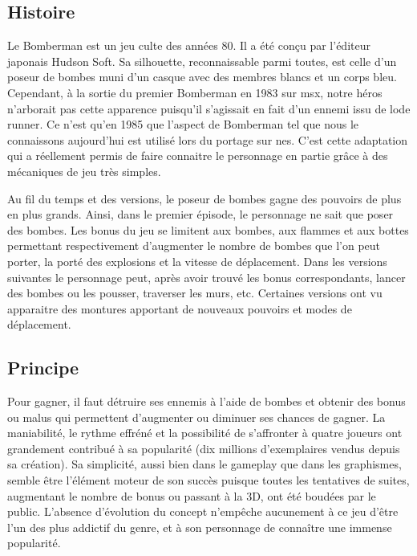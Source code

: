 
\subsection{Histoire}

Le Bomberman est un jeu culte des années 80. Il a été conçu par l'éditeur japonais Hudson Soft. Sa silhouette, reconnaissable parmi toutes, est celle d'un poseur de bombes muni d'un casque avec des membres blancs et un corps bleu. Cependant, à la sortie du premier Bomberman en 1983 sur \gls{msx}, notre héros n'arborait pas cette apparence puisqu'il s'agissait en fait d'un ennemi issu de \gls{lode runner}. Ce n'est qu'en 1985 que l'aspect de Bomberman tel que nous le connaissons aujourd'hui est utilisé lors du portage sur \gls{nes}. C'est cette adaptation qui a réellement permis de faire connaitre le personnage en partie grâce à des mécaniques de jeu très simples.

Au fil du temps et des versions, le poseur de bombes gagne des pouvoirs de plus en plus grands. Ainsi, dans le premier épisode, le personnage ne sait que poser des bombes. Les bonus du jeu se limitent aux bombes, aux flammes et aux bottes permettant respectivement d'augmenter le nombre de bombes que l'on peut porter, la porté des explosions et la vitesse de déplacement. Dans les versions suivantes le personnage peut, après avoir trouvé les bonus correspondants, lancer des bombes ou les pousser, traverser les murs, etc. Certaines versions ont vu apparaitre des montures apportant de nouveaux pouvoirs et modes de déplacement.


\subsection{Principe}
Pour gagner, il faut détruire ses ennemis à l'aide de bombes et obtenir des bonus ou malus qui permettent d'augmenter ou diminuer ses chances de gagner. La maniabilité, le rythme effréné et la possibilité de s’affronter à quatre joueurs ont grandement contribué à sa popularité (dix millions d’exemplaires vendus depuis sa création). Sa simplicité, aussi bien dans le gameplay que dans les graphismes, semble être l’élément moteur de son succès puisque toutes les tentatives de suites, augmentant le nombre de bonus ou passant à la 3D, ont été boudées par le public. L’absence d’évolution du concept n’empêche aucunement à ce jeu d’être l’un des plus addictif du genre, et à son personnage de connaître une immense popularité. 